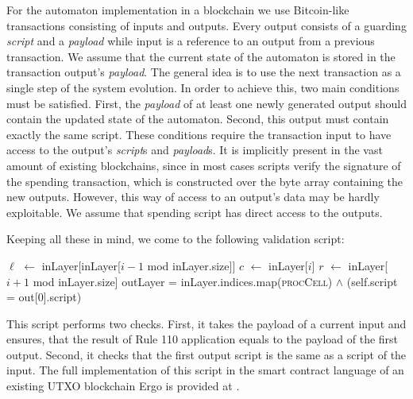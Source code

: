 \documentclass[runningheads]{llncs}
\newcommand{\payload}{\textit{payload}}
\newcommand{\script}{\textit{script}}
\def\Let#1#2{\State #1 $\gets$ #2}
\begin{document}
    For the automaton implementation in a blockchain we use Bitcoin-like
    transactions consisting of inputs and outputs. Every output consists of a
    guarding \script{} and a \payload{} while input is a reference to an
    output from a previous transaction.  We assume that the current state of the
    automaton is stored in the transaction output's \payload{}.  The general
    idea is to use the next transaction as a single step of the system
    evolution. In order to achieve this, two main conditions must be satisfied.
    First, the \payload{} of at least one newly generated output should contain
    the updated state of the automaton. Second, this output must contain exactly
    the same script. These conditions require the transaction input to have
    access to the output's \script{}s and \payload{}s.  It is implicitly present
    in the vast amount of existing blockchains, since in most cases scripts
    verify the signature of the spending transaction, which is constructed over
    the byte array containing the new outputs.  However, this way of access to
    an output's data may be hardly exploitable.  We assume that
    spending script has direct access to the outputs.

    Keeping all these in mind, we come to the following validation script:

    \begin{algorithm}[H]
        \caption{Script, that ensures that the transaction performs correct rule 110 transformation
        keeping the same rules for further iterations}
        \label{alg:isRule110}
        \begin{algorithmic}[1]
            \Let{$\ell$}{inLayer[inLayer[$i-1$ mod inLayer.size]]}
            \Let{$c$}{inLayer[$i$]}
            \Let{$r$}{inLayer[$i+1$ mod inLayer.size]}
            \State
            \Return {}
            \EndFunction
            \State \Return outLayer = inLayer.indices.map(\textsc{procCell})
            \EndFunction
            \State
            \Return {}
            $\wedge$ (self.script = out[0].script)
            \EndFunction
        \end{algorithmic}
    \end{algorithm}

    This script performs two checks. First, it takes the payload of a current
    input and ensures, that the result of Rule 110 application equals to the
    payload of the first output. Second, it checks that the first output script
    is the same as a script of the input. The full implementation of this script
    in the smart contract language of an existing UTXO blockchain Ergo is
    provided at \cite{ergoScript1}.
\end{document}
